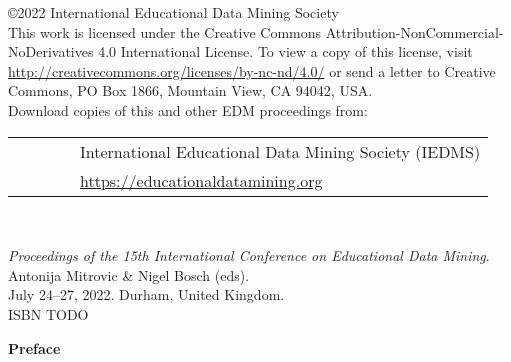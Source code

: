 \documentclass[letterpaper,11pt,oneside]{book} %
\begin{document}
\clearpage

\thispagestyle{empty}


\large
\noindent
\copyright 2022 International Educational Data Mining Society\\

This work is licensed under the Creative Commons Attribution-NonCommercial-NoDerivatives 4.0 International License. To view a copy of this license, visit \url{http://creativecommons.org/licenses/by-nc-nd/4.0/} or send a letter to Creative Commons, PO Box 1866, Mountain View, CA 94042, USA.\\

Download copies of this and other EDM proceedings from:

\begin{tabular}{ll}
\ \ \ \ \ \ & International Educational Data Mining Society (IEDMS)\\
&{\url{https://educationaldatamining.org}}\\
\end{tabular}\\

\vspace*{\fill}


\textit{Proceedings of the 15th International Conference on Educational Data Mining}.\\ Antonija Mitrovic \& Nigel Bosch (eds).\\ July 24--27, 2022. 
    Durham, United Kingdom.\\
\noindent ISBN TODO\\

\clearpage


{} 


\begin{center}
  {\Large \bf Preface}
\end{center}
\end{document}
